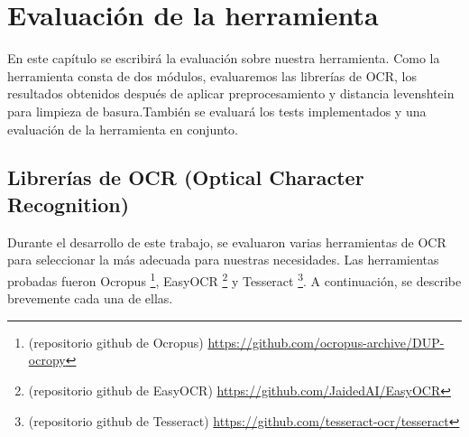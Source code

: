 \chapter{Evaluación de la herramienta}
\label{cap:evaluacion}

En este capítulo se escribirá la evaluación sobre nuestra herramienta. Como la herramienta consta de dos módulos, evaluaremos las librerías de OCR, los resultados obtenidos después de aplicar preprocesamiento y distancia levenshtein para limpieza de basura.También se evaluará los tests implementados y una evaluación de la herramienta en conjunto.
\section{Librerías de OCR (Optical Character Recognition)}
\label{sec:Seleccion de libreria de OCR}
Durante el desarrollo de este trabajo, se evaluaron varias herramientas de OCR para seleccionar la más adecuada para nuestras necesidades. Las herramientas probadas fueron Ocropus	\footnote{(repositorio github de Ocropus) \url{https://github.com/ocropus-archive/DUP-ocropy} }, EasyOCR	\footnote{(repositorio github de EasyOCR) \url{https://github.com/JaidedAI/EasyOCR} } y Tesseract	\footnote{(repositorio github de Tesseract) \url{https://github.com/tesseract-ocr/tesseract} }. A continuación, se describe brevemente cada una de ellas.
